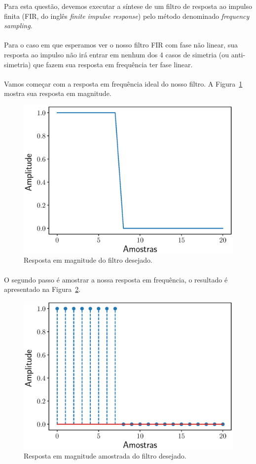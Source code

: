 \documentclass{homeworkclass}
\begin{document}
\begin{homeworkProblem}
Para esta questão, devemos executar a síntese de um filtro de resposta ao impulso finita (FIR, do inglês \textit{finite impulse response}) pelo método denominado \textit{frequency sampling}. 

\begin{homeworkSection}

\paragraph{} Para o caso em que esperamos ver o nosso filtro FIR com fase não linear, sua resposta ao impulso não irá entrar em nenhum dos 4 casos de simetria (ou anti-simetria) que fazem sua resposta em frequência ter fase linear. 


\paragraph{}Vamos começar com a resposta em frequência ideal do nosso filtro. A  Figura~\ref{fig:ideal_nl} mostra sua resposta em magnitude. 

\begin{figure}[!ht]
	\centering
	\includegraphics[width=0.5\linewidth]{figs/ideal_nl}
	\caption{Resposta em magnitude do filtro desejado.}
	\label{fig:ideal_nl}
\end{figure}

\paragraph{}O segundo passo é amostrar a nossa resposta em frequência, o resultado é apresentado na Figura~\ref{fig:ideal_amostrado_nl}.

\begin{figure}[!ht]
	\centering
	\includegraphics[width=0.5\linewidth]{figs/ideal_amostrado_nl}
	\caption{Resposta em magnitude amostrada do filtro desejado.}
	\label{fig:ideal_amostrado_nl}
\end{figure}


\end{homeworkSection}
\end{homeworkProblem}
\end{document}
